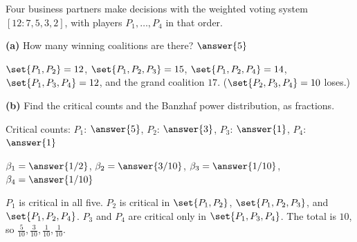 \documentclass[12pt]{ximera}
\begin{document}
\begin{problem}
Four business partners make decisions with the weighted voting system $[12:7,5,3,2]$, with
players $P_1,\dots,P_4$ in that order.

\begin{prompt}
\textbf{(a)} How many winning coalitions are there? $\answer{5}$
\begin{feedback}
$\set{P_1,P_2}=12$, $\set{P_1,P_2,P_3}=15$, $\set{P_1,P_2,P_4}=14$, $\set{P_1,P_3,P_4}=12$, and the grand coalition $17$. ($\set{P_2,P_3,P_4}=10$ loses.)
\end{feedback}
\end{prompt}

\begin{prompt}
\textbf{(b)} Find the critical counts and the Banzhaf power distribution, as fractions.

Critical counts: $P_1$: $\answer{5}$, $P_2$: $\answer{3}$,
$P_3$: $\answer{1}$, $P_4$: $\answer{1}$

\smallskip
$\beta_1=\answer{1/2}$, $\beta_2=\answer{3/10}$,
$\beta_3=\answer{1/10}$, $\beta_4=\answer{1/10}$
\begin{feedback}
$P_1$ is critical in all five. $P_2$ is critical in $\set{P_1,P_2}$, $\set{P_1,P_2,P_3}$, and $\set{P_1,P_2,P_4}$. $P_3$ and $P_4$ are critical only in $\set{P_1,P_3,P_4}$. The total is $10$, so $\frac5{10},\frac3{10},\frac1{10},\frac1{10}$.
\end{feedback}
\end{prompt}
\end{problem}
\end{document}
